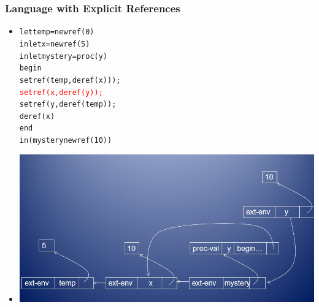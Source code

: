\documentclass{beamer}
\begin{document}
\begin{frame}[fragile]
\frametitle{Language with Explicit References}
\begin{scriptsize}
\begin{itemize}
\item<1->
\begin{alltt}
let temp = newref(0)
in  let x = newref(5)
    in  let mystery = proc (y)
                        begin
                          setref(temp, deref(x)));
                          \textcolor{red}{setref(x, deref(y));}
                          setref(y, deref(temp));
                          deref(x)
				        end
	    in (mystery newref(10))
\end{alltt}

\item<1->
\begin{center}
\includegraphics[scale=0.5]{mystery3.jpg}
\end{center}

\end{itemize}
\end{scriptsize}
\end{frame}
\end{document}
